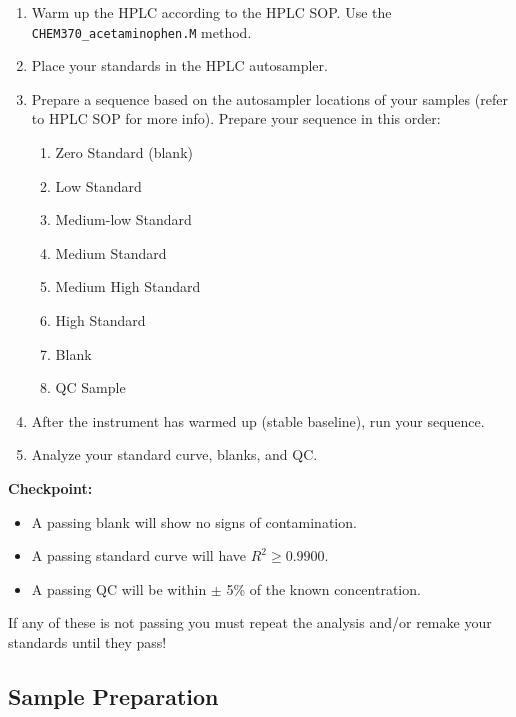 \documentclass[]{tufte-book}
\providecommand{\tightlist}{%
  \setlength{\itemsep}{0pt}\setlength{\parskip}{0pt}}
\begin{document}
\begin{enumerate}
\def\labelenumi{\arabic{enumi}.}
\tightlist
\item
  Warm up the HPLC according to the HPLC SOP. Use the \texttt{CHEM370\_acetaminophen.M} method.
\item
  Place your standards in the HPLC autosampler.
\item
  Prepare a sequence based on the autosampler locations of your samples (refer to HPLC SOP for more info). Prepare your sequence in this order:

  \begin{enumerate}
  \def\labelenumii{\arabic{enumii}.}
  \tightlist
  \item
    Zero Standard (blank)
  \item
    Low Standard
  \item
    Medium-low Standard
  \item
    Medium Standard
  \item
    Medium High Standard
  \item
    High Standard
  \item
    Blank
  \item
    QC Sample
  \end{enumerate}
\item
  After the instrument has warmed up (stable baseline), run your sequence.
\item
  Analyze your standard curve, blanks, and QC.
\end{enumerate}

\begin{marginfigure}
  \textbf{Checkpoint:}
  
  \begin{itemize}
  \tightlist
  \item
    A passing blank will show no signs of contamination.\\
  \item
    A passing standard curve will have \(R^2 \ge 0.9900\).\\
  \item
    A passing QC will be within \(\pm\) 5\% of the known concentration.
  \end{itemize}
  
  If any of these is not passing you must repeat the analysis and/or
  remake your standards until they pass!
  \end{marginfigure}

\hypertarget{sample-preparation-2}{%
\subsection{Sample Preparation}\label{sample-preparation-2}}
\end{document}
